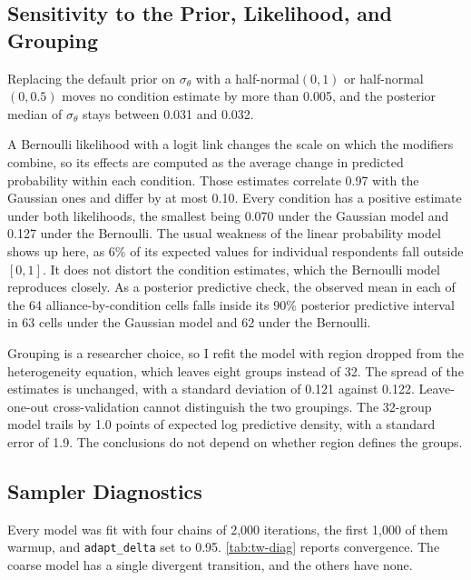 \documentclass[12pt]{article}
\begin{document}
\subsection{Sensitivity to the Prior, Likelihood, and Grouping}

Replacing the default prior on $\sigma_\theta$ with a half-normal$(0, 1)$ or half-normal$(0, 0.5)$ moves no condition estimate by more than 0.005, and the posterior median of $\sigma_\theta$ stays between 0.031 and 0.032.

A Bernoulli likelihood with a logit link changes the scale on which the modifiers combine, so its effects are computed as the average change in predicted probability within each condition.
Those estimates correlate 0.97 with the Gaussian ones and differ by at most 0.10.
Every condition has a positive estimate under both likelihoods, the smallest being 0.070 under the Gaussian model and 0.127 under the Bernoulli.
The usual weakness of the linear probability model shows up here, as 6\% of its expected values for individual respondents fall outside $[0, 1]$.
It does not distort the condition estimates, which the Bernoulli model reproduces closely.
As a posterior predictive check, the observed mean in each of the 64 alliance-by-condition cells falls inside its 90\% posterior predictive interval in 63 cells under the Gaussian model and 62 under the Bernoulli.

Grouping is a researcher choice, so I refit the model with region dropped from the heterogeneity equation, which leaves eight groups instead of 32.
The spread of the estimates is unchanged, with a standard deviation of 0.121 against 0.122.
Leave-one-out cross-validation cannot distinguish the two groupings. The 32-group model trails by 1.0 points of expected log predictive density, with a standard error of 1.9.
The conclusions do not depend on whether region defines the groups.

\subsection{Sampler Diagnostics}

Every model was fit with four chains of 2,000 iterations, the first 1,000 of them warmup, and \texttt{adapt\_delta} set to 0.95.
\autoref{tab:tw-diag} reports convergence.
The coarse model has a single divergent transition, and the others have none.
\end{document}
